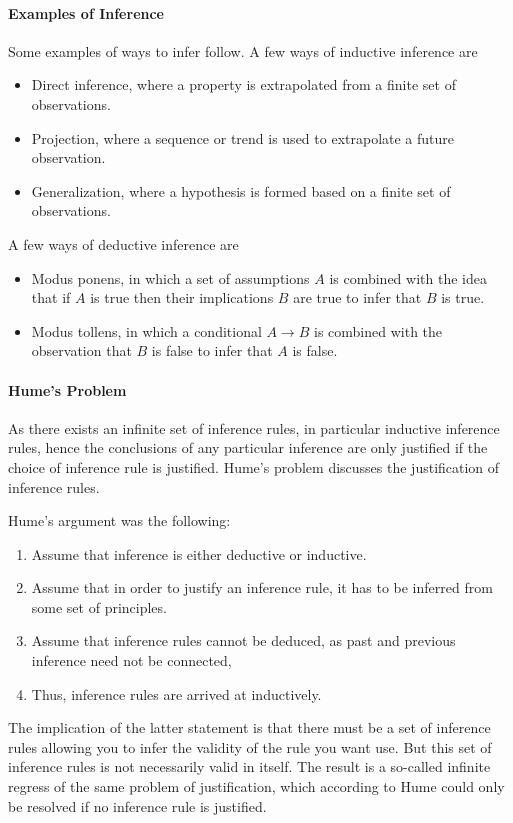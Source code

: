 \paragraph{Examples of Inference}
Some examples of ways to infer follow. A few ways of inductive inference are
\begin{itemize}
	\item Direct inference, where a property is extrapolated from a finite set of observations.
	\item Projection, where a sequence or trend is used to extrapolate a future observation.
	\item Generalization, where a hypothesis is formed based on a finite set of observations.
\end{itemize}

A few ways of deductive inference are
\begin{itemize}
	\item Modus ponens, in which a set of assumptions $A$ is combined with the idea that if $A$ is true then their implications $B$ are true to infer that $B$ is true.
	\item Modus tollens, in which a conditional $A\to B$ is combined with the observation that $B$ is false to infer that $A$ is false. 
\end{itemize}

\paragraph{Hume's Problem}
As there exists an infinite set of inference rules, in particular inductive inference rules, hence the conclusions of any particular inference are only justified if the choice of inference rule is justified. Hume's problem discusses the justification of inference rules.

Hume's argument was the following:
\begin{enumerate}
	\item Assume that inference is either deductive or inductive.
	\item Assume that in order to justify an inference rule, it has to be inferred from some set of principles.
	\item Assume that inference rules cannot be deduced, as past and previous inference need not be connected,
	\item Thus, inference rules are arrived at inductively.
\end{enumerate}
The implication of the latter statement is that there must be a set of inference rules allowing you to infer the validity of the rule you want use. But this set of inference rules is not necessarily valid in itself. The result is a so-called infinite regress of the same problem of justification, which according to Hume could only be resolved if no inference rule is justified.

